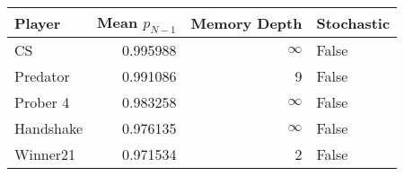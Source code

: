 \begin{tabular}{lrrl}
\toprule
    Player &  Mean $p_{N-1}$ &  Memory Depth & Stochastic \\
\midrule
        CS &        0.995988 &            \(\infty\) &      False \\
  Predator &        0.991086 &             9 &      False \\
  Prober 4 &        0.983258 &            \(\infty\) &      False \\
 Handshake &        0.976135 &            \(\infty\) &      False \\
  Winner21 &        0.971534 &             2 &      False \\
\bottomrule
\end{tabular}
